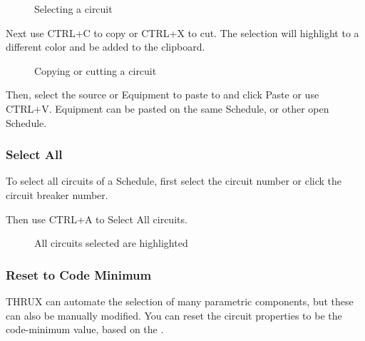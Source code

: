 \documentclass[letterpaper,10pt,english]{sphinxmanual}
\begin{document}
\begin{figure}[H]
\centering
\capstart

\noindent{}
\caption{Selecting a circuit}\label{\detokenize{docs/userguide/buildingelectricalmodel/schedules/index-schedules:id7}}\end{figure}

Next use CTRL+C to copy or CTRL+X to cut. The selection will highlight to a different color and be added to the clipboard.

\begin{figure}[H]
\centering
\capstart

\noindent{}
\caption{Copying or cutting a circuit}\label{\detokenize{docs/userguide/buildingelectricalmodel/schedules/index-schedules:id8}}\end{figure}

Then, select the source or Equipment to paste to and click Paste or use CTRL+V.  Equipment can be pasted on the same Schedule, or other open Schedule.


\subsubsection{Select All}
\label{\detokenize{docs/userguide/buildingelectricalmodel/schedules/index-schedules:select-all}}
To select all circuits of a Schedule, first select the circuit number or click the circuit breaker number.

Then use CTRL+A to Select All circuits.

\begin{figure}[H]
\centering
\capstart

\noindent{}
\caption{All circuits selected are highlighted}\label{\detokenize{docs/userguide/buildingelectricalmodel/schedules/index-schedules:id9}}\end{figure}

\ignorespaces 
{}\ignorespaces 

\subsubsection{Reset to Code Minimum}
\label{\detokenize{docs/userguide/buildingelectricalmodel/schedules/index-schedules:reset-to-code-minimum}}\label{\detokenize{docs/userguide/buildingelectricalmodel/schedules/index-schedules:schedules-reset-to-code-minimum}}\label{\detokenize{docs/userguide/buildingelectricalmodel/schedules/index-schedules:index-2}}
THRUX can automate the selection of many parametric components, but these can also be manually modified.  You can reset the circuit properties to be the code-minimum value, based on the {\hyperref[\detokenize{docs/faq:load-capacity}]{}}.
\end{document}
